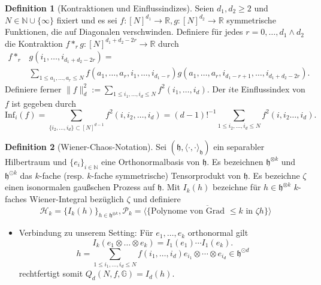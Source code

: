 \documentclass[11pt, ngerman]{scrartcl}
\theoremstyle{definition}
\newtheorem{definition}{Definition}
\theoremstyle{plain}
\newcommand{\R}[0]{\mathbb{R}}
\newcommand{\N}[0]{\mathbb{N}}
\newcommand{\Ch}[1]{\mathcal{H}_{#1}}
\newcommand{\Pol}[1]{\mathcal{P}_{#1}}
\newcommand{\Hil}[0]{\mathfrak{h}}
\newcommand{\<}{\langle}
\renewcommand{\>}{\rangle}
\newcommand{\norm}[1]{\lVert#1\rVert}
\begin{document}
\begin{definition}[Kontraktionen und Einflussindizes]
        Seien $d_1, d_2 \geq 2$ und $N\in \N \cup \{\infty\}$ fixiert und es sei $f: [N]^{d_1} \to \R, g: [N]^{d_2} \to \R$ symmetrische Funktionen, die auf Diagonalen verschwinden. 
        Definiere für jedes $r = 0, \ldots, d_1 \wedge d_2$ die Kontraktion $f *_r g: [N]^{d_1 + d_2 - 2r} \to \R$ durch \begin{align*}
        f *_r& g(i_1, \ldots,  i_{d_1 + d_2 - 2r}) = \\ &\sum_{1 \leq a_1, \ldots, a_r \leq N} f(a_{1}, \ldots, a_r, i_1, \ldots, i_{d_1 -r}) g(a_1, \ldots, a_r, i_{d_1 - r +1}, \ldots, i_{d_1 + d_2 - 2r}).
        \end{align*}
        Definiere ferner $\norm{f}_d^2 := \sum_{1 \leq i_1, \ldots, i_d \leq N} f^2(i_1, \ldots, i_d)$.
        Der $i$te Einflussindex von $f$ ist gegeben durch \[
        \text{Inf}_i(f) = \sum_{\{i_2, \ldots, i_d\} \subset [N]^{d-1}} f^2(i, i_2, \ldots, i_d) = (d-1)!^{-1} \sum_{1 \leq i_2, \ldots, i_d \leq N} f^2(i, i_2 \ldots, i_d).
        \]
    \end{definition}
\begin{definition}[Wiener-Chaos-Notation]
    Sei $(\Hil, \<\cdot, \cdot\>_{\Hil})$ ein separabler Hilbertraum und $\{e_i\}_{i \in \N}$ eine Orthonormalbasis von $\Hil$. Es bezeichnen $\Hil^{\otimes k}$ und $\Hil^{\odot k}$ das $k$-fache (resp. $k$-fache symmetrische) Tensorprodukt von $\Hil$. 
    Es bezeichne $\zeta$ einen isonormalen gaußschen Prozess auf $\Hil$. 
    Mit $I_k(h)$ bezeichne für $h \in \Hil^{\otimes k}$ $k$-faches Wiener-Integral bezüglich $\zeta$ und definiere \[\Ch{k} = \{I_k(h)\}_{h \in \Hil^{\otimes k}}, \Pol{k} = \overline{\<\{\text{Polynome von Grad } \leq k \text{ in } \zeta h\}\>}\]
    \end{definition}
    \begin{itemize}
        \item Verbindung zu unserem Setting: Für $e_1, \ldots, e_k$ orthonormal gilt \[I_k(e_1 \otimes \ldots \otimes e_k) = I_1(e_1) \cdots I_1(e_k). 
        \]
        \[
        h = \sum_{1 \leq i_1, \ldots, i_d \leq N} f(i_1, \ldots, i_d) e_{i_1} \otimes \cdots \otimes e_{i_d} \in \Hil^{\odot d}
        \] rechtfertigt somit $Q_d(N,f,\mathbb{G}) = I_d(h)$.
    \end{itemize}
\end{document}
